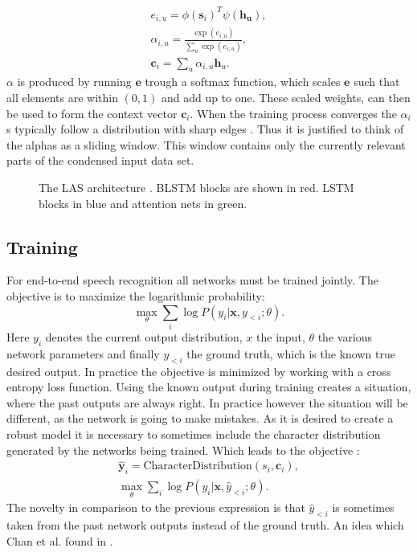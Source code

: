 \begin{align}
e_{i,u} = \phi(\mathbf{s}_i)^T \psi(\mathbf{h_u}), \\
\alpha_{i,u} = \frac{ \exp(e_{i,u})}{ \sum\limits_{u} \exp(e_{i,u})}, \\
\label{eq:alphas}
\mathbf{c}_i = \sum\limits_{u} \alpha_{i,u} \mathbf{h}_u.
\end{align}
$\alpha$ is produced by running $\mathbf{e}$ trough a softmax function, which scales $\mathbf{e}$ such that all elements are within $(0,1)$ and add up to one. These scaled weights, can then be used to form the context vector $\mathbf{c}_i$. When the training process converges the $\alpha_i$s typically follow a distribution with sharp edges \cite[page 5]{Chan2015}. Thus it is justified to think of the alphas as a sliding window. This window contains only the currently relevant parts of the condensed input data set.

\begin{figure}

\caption{The LAS architecture \cite[page 3]{Chan2015}. BLSTM blocks are shown in red. LSTM blocks in blue and attention nets in green.}
\label{fig:las}
\end{figure}

\subsection{Training}
For end-to-end speech recognition all networks must be trained jointly. The objective is to maximize the logarithmic probability:
\begin{equation}
\max\limits_\theta \sum\limits_{i} \log P(y_i | \mathbf{x}, y_{<i};\theta).
\end{equation}
Here $y_i$ denotes the current output distribution, $x$ the input, $\theta$ the various network parameters and finally $y_{<i}$ the ground truth, which is the known true desired output. In practice the objective is minimized by working with a cross entropy loss function.
Using the known output during training creates a situation, where the past outputs are always right. In practice however the situation will be different, as the network is going to make mistakes. As it is desired to create a robust model it is necessary to sometimes include the character distribution generated by the networks being trained.
Which leads to the objective \cite[page 5]{Chan2015}:
\begin{align}
\hat{\mathbf{y}}_{i} = \text{CharacterDistribution}(s_i,\textbf{c}_i), \\
\max_{\theta} \sum\limits_{i} \log P(y_i|\mathbf{x}, \hat{y}_{<i};\theta).
\end{align}
The novelty in comparison to the previous expression is that $\hat{y}_{<i}$ is sometimes taken from the past network outputs instead of the ground truth. An idea which Chan et al. found in \cite{Bengio2015}.

